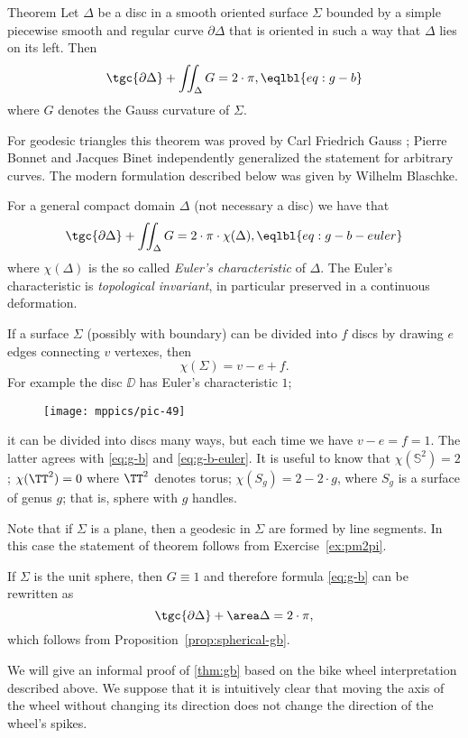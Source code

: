 \begin{thm}{Theorem}\label{thm:gb}
Let $\Delta$ be a disc in a smooth oriented surface $\Sigma$ bounded by a simple piecewise smooth and regular curve $\partial \Delta$ that is oriented in such a way that $\Delta$ lies on its left.
Then 
\[\tgc{\partial\Delta}+\iint_\Delta G=2\cdot \pi,\eqlbl{eq:g-b}\]
where $G$ denotes the Gauss curvature of $\Sigma$.
\end{thm}

For geodesic triangles this theorem was proved by Carl Friedrich Gauss \cite{gauss};
Pierre Bonnet and Jacques Binet independently generalized the statement for arbitrary curves. 
The modern formulation described below was given by Wilhelm Blaschke. 


For a general compact domain $\Delta$ (not necessary a disc) we have that
\[\tgc{\partial\Delta}+\iint_{\Delta} G=2\cdot  \pi\cdot\chi(\Delta),\eqlbl{eq:g-b-euler}\]
where $\chi(\Delta)$ is the so called \emph{Euler's characteristic} of $\Delta$.
The Euler's characteristic is \emph{topological invariant}, in particular preserved in a continuous deformation.

If a surface $\Sigma$ (possibly with boundary) can be divided into $f$ discs by drawing $e$ edges connecting $v$ vertexes, then 
\[\chi(\Sigma)=v-e+f.\]
For example the disc $\DD$ has Euler's characteristic $1$; 
\begin{figure}[h!]
\vskip-0mm
\centering
\texttt{[image: mppics/pic-49]}
\vskip-0mm
\end{figure}
it can be divided into discs many ways, 
but each time we have $v-e=f=1$.
The latter agrees with \ref{eq:g-b} and \ref{eq:g-b-euler}.
It is useful to know that $\chi(\mathbb{S}^2)=2$; $\chi(\TT^2)=0$ where $\TT^2$ denotes torus; 
$\chi(S_g)=2-2\cdot g$, where $S_g$ is a surface of genus $g$;
that is, sphere with $g$ handles.

 Note that if $\Sigma$ is a plane, then a geodesic in $\Sigma$ are formed by line segments.
In this case the statement of theorem follows from Exercise~\ref{ex:pm2pi}.

 If $\Sigma$ is the unit sphere, then $G\equiv1$ and therefore formula \ref{eq:g-b} can be rewritten as 
\[\tgc{\partial\Delta}+\area\Delta=2\cdot \pi,\]
which follows from Proposition~\ref{prop:spherical-gb}.

\medskip

We will give an informal proof of \ref{thm:gb} based on the bike wheel interpretation described above.
We suppose that it is intuitively clear that moving the axis of the wheel without changing its direction does not change the direction of the wheel's spikes.

